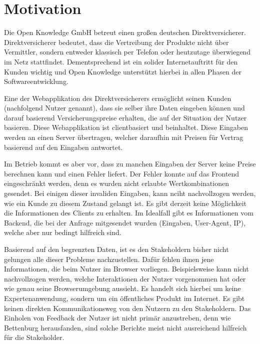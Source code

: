 \section{Motivation}

Die Open Knowledge GmbH betreut einen großen deutschen Direktversicherer. Direktversicherer bedeutet, dass die Vertreibung der Produkte nicht über Vermittler, sondern entweder klassisch per Telefon oder heutzutage überwiegend im Netz stattfindet. Dementsprechend ist ein solider Internetauftritt für den Kunden wichtig und Open Knowledge unterstützt hierbei in allen Phasen der Softwareentwicklung.

Eine der Webapplikation des Direktversicherers ermöglicht seinen Kunden (nachfolgend Nutzer genannt), dass sie selber ihre Daten eingeben können und darauf basierend Versicherungspreise erhalten, die auf der Situation der Nutzer basieren. Diese Webapplikation ist clientbasiert und beinhaltet. Diese Eingaben werden an einen Server übertragen, welcher daraufhin mit Preisen für Vertrag basierend auf den Eingaben antwortet.

Im Betrieb kommt es aber vor, dass zu manchen Eingaben der Server keine Preise berechnen kann und einen Fehler liefert. Der Fehler konnte auf das Frontend eingeschränkt werden, denn es wurden nicht erlaubte Wertkombinationen gesendet. Bei einigen dieser invaliden Eingaben, kann nciht nachvollzogen werden, wie ein Kunde zu diesem Zustand gelangt ist. Es gibt derzeit keine Möglichkeit die Informationen des Clients zu erhalten. Im Idealfall gibt es Informationen vom Backend, die bei der Anfrage mitgesendet wurden (Eingaben, User-Agent, IP), welche aber nur bedingt hilfreich sind.


Basierend auf den begrenzten Daten, ist es den Stakeholdern bisher nicht gelungen alle dieser Probleme nachzustellen. Dafür fehlen ihnen jene Informationen, die beim Nutzer im Browser vorliegen. Beispielsweise kann nicht nachvollzogen werden, welche Interaktionen der Nutzer vorgenommen hat oder wie genau seine Browserumgebung aussieht. Es handelt sich hierbei um keine Expertenanwendung, sondern um ein öffentliches Produkt im Internet. Es gibt keinen direkten Kommunikationsweg von den Nutzern zu den Stakeholdern. Das Einholen von Feedback der Nutzer ist nicht primär anzustreben, denn wie Bettenburg \etal \cite{WhatMakesAGoodBugReport} herausfanden, sind solche Berichte meist nicht ausreichend hilfreich für die Stakeholder.


